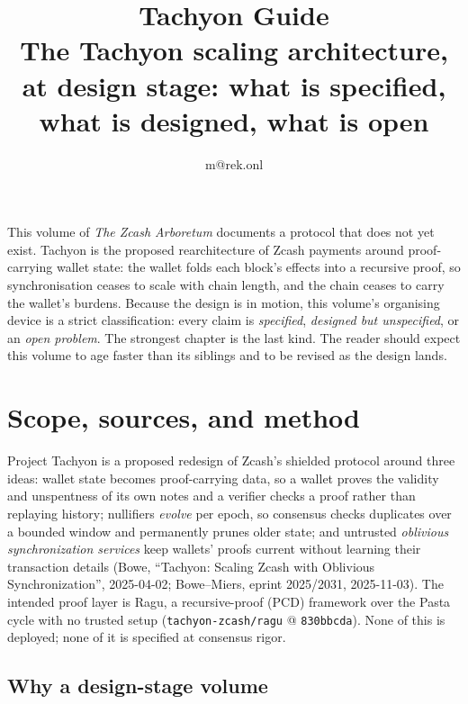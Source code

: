 \documentclass[11pt,a4paper]{article}
\title{\textbf{\Huge Tachyon Guide}\\[6pt]\large The Tachyon scaling architecture, at design stage: what is specified, what is designed, what is open}
\author{m@rek.onl}
\date{}
\theoremstyle{definition}
\renewenvironment{abstract}{%
  \small\begin{center}{\bfseries\abstractname}\end{center}\medskip\noindent\ignorespaces
}{\par\medskip}
\begin{document}
\maketitle
\thispagestyle{empty}
\begin{abstract}
This volume of \emph{The Zcash Arboretum} documents a protocol that does not yet exist.
Tachyon is the proposed rearchitecture of Zcash payments around proof-carrying
wallet state: the wallet folds each block's effects into a recursive proof, so
synchronisation ceases to scale with chain length, and the chain ceases to
carry the wallet's burdens. Because the design is in motion, this volume's
organising device is a strict classification: every claim is
\emph{specified}, \emph{designed but unspecified}, or an \emph{open problem}.
The strongest chapter is the last kind. The reader should expect this volume
to age faster than its siblings and to be revised as the design lands.
\end{abstract}
\clearpage
\tableofcontents
\clearpage
\section{Scope, sources, and method}\label{sec:tachyon-scope}

Project Tachyon is a proposed redesign of Zcash's shielded protocol around
three ideas: wallet state becomes proof-carrying data, so a wallet proves the
validity and unspentness of its own notes and a verifier checks a proof rather
than replaying history; nullifiers \emph{evolve} per epoch, so consensus
checks duplicates over a bounded window and permanently prunes older state;
and untrusted \emph{oblivious synchronization services} keep wallets' proofs
current without learning their transaction details (Bowe, ``Tachyon: Scaling
Zcash with Oblivious Synchronization'', 2025-04-02; Bowe--Miers, eprint
2025/2031, 2025-11-03). The intended proof layer is Ragu, a recursive-proof
(PCD) framework over the Pasta cycle with no trusted setup
(\texttt{tachyon-zcash/ragu} @ \texttt{830bbcda}). None of this is deployed;
none of it is specified at consensus rigor.

\subsection{Why a design-stage volume}\label{sec:tachyon-why}
\end{document}
